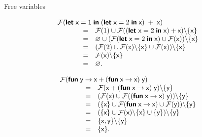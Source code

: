\documentclass[compress,dvipdfmx]{beamer}
\newcommand\FV[1]{\mathcal{F}({#1})}
\begin{document}
%
\begin{frame}{Free variables}

  \begin{equation*}
    \begin{array}{lcl}
      \multicolumn{3}{l}{
        \FV{\Xlet \; \textsf{x} = 1 \;
          \Xin \; (\Xlet \; \textsf{x} = 2 \;
          \Xin \; \textsf{x}) \; + \; \textsf{x}}} \\
      \phantom{XXX} &=& \FV{1} \cup \FV{(\Xlet \; \textsf{x}
        = 2 \; \Xin \; \textsf{x}) +
        \textsf{x}} \backslash \{\textsf{x}\}\\
      \phantom{XXX} &=& \varnothing \cup (\FV{\Xlet \;
        \textsf{x} = 2 \; \Xin \;
        \textsf{x}} \cup \FV{\textsf{x}}) \backslash \{\textsf{x}\}\\
      \phantom{XXX} &=& (\FV{2} \cup \FV{\textsf{x}} \backslash
      \{\textsf{x}\}  \cup \FV{\textsf{x}}) \backslash
      \{\textsf{x}\}\\
      \phantom{XXX} &=& \FV{\textsf{x}} \backslash \{\textsf{x}\}\\
      \phantom{XXX} &=& \varnothing.
    \end{array}
  \end{equation*}

  \bigskip

  \begin{equation*}
    \begin{array}{lcl}
      \multicolumn{3}{l}{ \FV{\Xfun \; \textsf{y} \rightarrow
          \textsf{x} + (\Xfun \; \textsf{x}
          \rightarrow \textsf{x}) \; \textsf{y}}}\\ \phantom{X}
      &=& \FV{\textsf{x} + (\Xfun \; \textsf{x} \rightarrow
        \textsf{x}) \; \textsf{y}} \backslash
      \{\textsf{y}\}\\ \phantom{X} &=& (\FV{\textsf{x}} \cup
      \FV{(\Xfun \; \textsf{x} \rightarrow \textsf{x})
        \; \textsf{y}}) \backslash \{\textsf{y}\}\\ \phantom{X} &=&
      (\{\textsf{x}\} \cup \FV{\Xfun \; \textsf{x}
        \rightarrow \textsf{x}} \cup \FV{\textsf{y}})
      \backslash \{\textsf{y}\}\\ \phantom{X} &=& (\{\textsf{x}\}
      \cup \FV{\textsf{x}} \backslash \{\textsf{x}\} \cup
      \{\textsf{y}\}) \backslash \{\textsf{y}\}\\ \phantom{XXX} &=&
      \{\textsf{x}, \textsf{y}\} \backslash
      \{\textsf{y}\}\\ \phantom{X} &=& \{\textsf{x}\}.
    \end{array}
  \end{equation*}

\end{frame}
\end{document}

